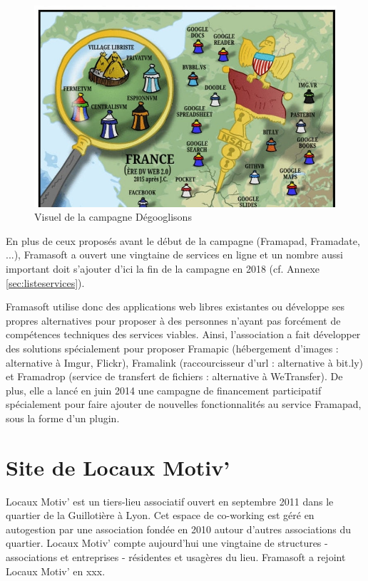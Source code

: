 \documentclass[10pt,a4paper, twoside]{report}
\begin{document}
	\begin{figure}[ht]
		\centerline{\includegraphics[width=1\textwidth]{images/degooglisons-internet.jpg}}
		\caption{Visuel de la campagne Dégooglisons}
		\label{visuel-campagne}
	\end{figure}

	
	En plus de ceux proposés avant le début de la campagne (Framapad, Framadate, ...), Framasoft a ouvert une vingtaine de services en ligne et un nombre aussi important doit s'ajouter d'ici la fin de la campagne en 2018 (cf. Annexe \ref{sec:listeservices}).
	
	Framasoft utilise donc des applications web libres existantes ou développe ses propres alternatives pour proposer à des personnes n'ayant pas forcément de compétences techniques des services viables.
	Ainsi, l'association a fait développer des solutions spécialement pour proposer Framapic (hébergement d'images : alternative à Imgur, Flickr), Framalink (raccourcisseur d'url : alternative à bit.ly) et Framadrop (service de transfert de fichiers : alternative à WeTransfer). De plus, elle a lancé en juin 2014 une campagne de financement participatif spécialement pour faire ajouter de nouvelles fonctionnalités au service Framapad, sous la forme d'un plugin.
	
	\section{Site de Locaux Motiv'}
	Locaux Motiv' est un tiers-lieu associatif ouvert en septembre 2011 dans le quartier de la Guillotière à Lyon. Cet espace de co-working est géré en autogestion par une association fondée en 2010 autour d'autres associations du quartier.
	Locaux Motiv' compte aujourd’hui une vingtaine de structures - associations et entreprises - résidentes et usagères du lieu. Framasoft a rejoint Locaux Motiv' en xxx.
	
\end{document}

